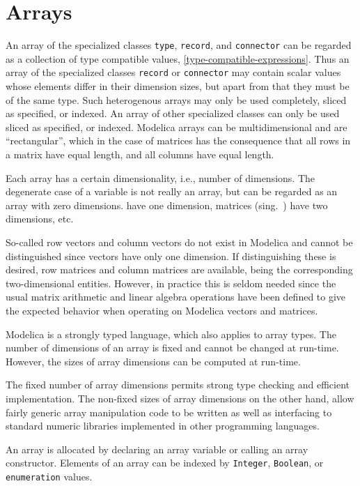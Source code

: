 \chapter{Arrays}\label{arrays}

An array of the specialized classes \lstinline!type!, \lstinline!record!, and \lstinline!connector! can be regarded as a collection of type compatible values, \cref{type-compatible-expressions}.
Thus an array of the specialized classes \lstinline!record! or \lstinline!connector! may contain scalar values whose elements differ in their dimension sizes, but apart from that they must be of the same type.
Such heterogenous arrays may only be used completely, sliced as specified, or indexed.
An array of other specialized classes can only be used sliced as specified, or indexed.
Modelica arrays can be multidimensional and are ``rectangular'', which in the case of matrices has the consequence that all rows in a matrix have equal length, and all columns have equal length.

Each array has a certain dimensionality, i.e., number of dimensions.
The degenerate case of a  variable is not really an array, but can be regarded as an array with zero dimensions.
 have one dimension, matrices (sing.\ ) have two dimensions, etc.

So-called row vectors and column vectors do not exist in Modelica and cannot be distinguished since vectors have only one dimension.
If distinguishing these is desired, row matrices and column matrices are available, being the corresponding two-dimensional entities.
However, in practice this is seldom needed since the usual matrix arithmetic and linear algebra operations have been defined to give the expected behavior when operating on Modelica vectors and matrices.

Modelica is a strongly typed language, which also applies to array types.
The number of dimensions of an array is fixed and cannot be changed at run-time.
However, the sizes of array dimensions can be computed at run-time.

The fixed number of array dimensions permits strong type checking and efficient implementation.
The non-fixed sizes of array dimensions on the other hand, allow fairly generic array manipulation code to be written as well as interfacing to standard numeric libraries implemented in other programming languages.

An array is allocated by declaring an array variable or calling an array constructor.
Elements of an array can be indexed by \lstinline!Integer!, \lstinline!Boolean!, or \lstinline!enumeration! values.


